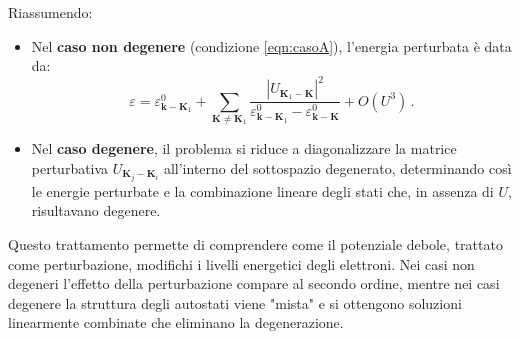 Riassumendo:
\begin{itemize}
	\item Nel \textbf{caso non degenere} (condizione \eqref{eqn:casoA}), l'energia perturbata è data da:
	\[
	\varepsilon = \varepsilon^0_{\mathbf{k}-\mathbf{K}_1} + \sum_{\mathbf{K} \neq \mathbf{K}_1} \frac{|U_{\mathbf{K}_1-\mathbf{K}}|^2}{\varepsilon^0_{\mathbf{k}-\mathbf{K}_1} - \varepsilon^0_{\mathbf{k}-\mathbf{K}}} + O(U^3)\,.
	\]
	\item Nel \textbf{caso degenere}, il problema si riduce a diagonalizzare la matrice perturbativa \(U_{\mathbf{K}_j-\mathbf{K}_i}\) all'interno del sottospazio degenerato, determinando così le energie perturbate e la combinazione lineare degli stati che, in assenza di \(U\), risultavano degenere.
\end{itemize}

Questo trattamento permette di comprendere come il potenziale debole, trattato come perturbazione, modifichi i livelli energetici degli elettroni. Nei casi non degeneri l'effetto della perturbazione compare al secondo ordine, mentre nei casi degenere la struttura degli autostati viene "mista" e si ottengono soluzioni linearmente combinate che eliminano la degenerazione.

\bigskip






